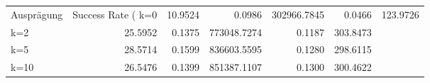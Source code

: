 \begin{tabular}{lrrrrr}
\toprule
Ausprägung & Success Rate (%
\midrule
k=0 & 10.9524 & 0.0986 & 302966.7845 & 0.0466 & 123.9726 \\
k=2 & 25.5952 & 0.1375 & 773048.7274 & 0.1187 & 303.8473 \\
k=5 & 28.5714 & 0.1599 & 836603.5595 & 0.1280 & 298.6115 \\
k=10 & 26.5476 & 0.1399 & 851387.1107 & 0.1300 & 300.4622 \\
\bottomrule
\end{tabular}
